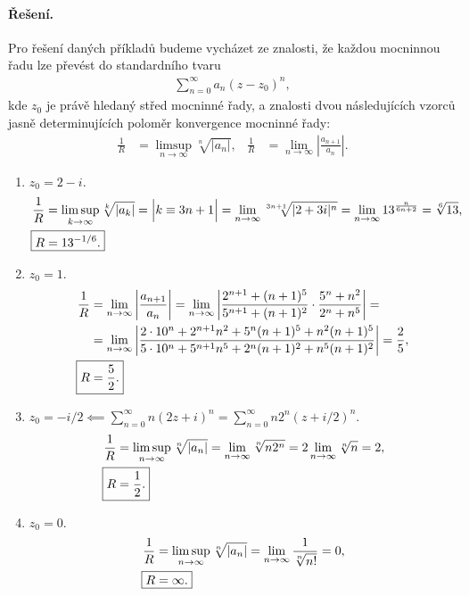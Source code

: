 \documentclass[11pt,a4paper]{article}
\begin{document}
	\paragraph*{Řešení.} Pro řešení daných příkladů budeme vycházet ze znalosti, že každou mocninnou řadu lze převést do standardního tvaru
		\begin{align}
				\sum_{n=0}^{\infty} a_n (z-z_0)^n,
		\end{align}
		kde $z_0$ je právě hledaný střed mocninné řady, a znalosti dvou následujících vzorců jasně determinujících poloměr konvergence mocninné řady:
		\begin{align}
				\frac 1R &= \limsup_{n\to\infty} \sqrt[n]{|a_n|},
			&
				\frac 1R &= \lim_{n\to\infty} \left| \frac{a_{n+1}}{a_n} \right|.
		\end{align}
		
		\begin{enumerate}[label=(\alph*)]
			
			\item $z_0 = 2-i$.
				\begin{align*}
						\frac 1R &= \limsup_{k\to\infty} \sqrt[k]{|a_k|} = \Big| k \equiv 3n+1 \Big| = \lim_{n\to\infty} \sqrt[3n+1]{|2+3i|^n} = 	\lim_{n\to\infty} 13^{\frac{n}{6n+2}} = \sqrt[6]{13},
					\\
						\Aboxed{R &= 13^{-1/6}.}
				\end{align*}
			
			\item $z_0 = 1$.
				\begin{align*}
						\frac 1R &= \lim_{n\to\infty} \left| \frac{a_{n+1}}{a_n} \right| = \lim_{n\to\infty} \left|\frac{2^{n+1}+(n+1)^5}{5^{n+1}+(n+1)^2} \cdot \frac{5^n+n^2}{2^n+n^5}  \right| =
					\\
						&= \lim_{n\to\infty} \left| \frac{2 \cdot 10^n+2^{n+1}n^2+5^n (n+1)^5 + n^2 (n+1)^5}{5 \cdot 10^n + 5^{n+1} n^5 + 2^n (n+1)^2 + n^5 (n+1)^2} \right| = \frac 25,
					\\
						\Aboxed{R &= \frac 52.}
				\end{align*}
			
			\item $z_0 = -i/2 \impliedby \sum_{n=0}^\infty n(2z+i)^n = \sum_{n=0}^\infty n2^n(z+i/2)^n$.
				\begin{align*}
						\frac 1R &= \limsup_{n\to\infty} \sqrt[n]{|a_n|} = \lim_{n\to\infty} \sqrt[n]{n 2^n} = 2 \lim_{n\to\infty} \sqrt[n]{n} = 2,
					\\
						\Aboxed{R &= \frac 12.}
				\end{align*}
			
			\item $z_0 = 0$.
				\begin{align*}
						\frac 1R &= \limsup_{n\to\infty} \sqrt[n]{|a_n|} = \lim_{n\to\infty} \frac{1}{\sqrt[n]{n!}} = 0,
					\\
						\Aboxed{R &= \infty.}
				\end{align*}
			
		\end{enumerate}
	
\end{document}
